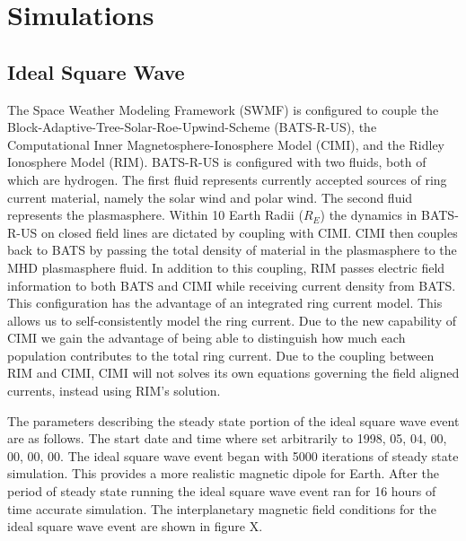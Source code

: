 \documentclass[utf8]{report}
\newcommand{\BATS}[1][0]{BATS-R-US }
\begin{document}
\chapter{Simulations}
 
\section{Ideal Square Wave}
The Space Weather Modeling Framework (SWMF) is configured to couple the Block-Adaptive-Tree-Solar-Roe-Upwind-Scheme (BATS-R-US), the Computational Inner Magnetosphere-Ionosphere Model (CIMI), and the Ridley Ionosphere Model (RIM). \BATS is configured with two fluids, both of which are hydrogen. The first fluid represents currently accepted sources of ring current material, namely the solar wind and polar wind. The second fluid represents the plasmasphere. Within 10 Earth Radii ($R_{E}$) the dynamics in \BATS on closed field lines are dictated by coupling with CIMI.  CIMI then couples back to BATS by passing the total density of material in the plasmasphere to the MHD plasmasphere fluid. In addition to this coupling, RIM passes electric field information to both BATS and CIMI while receiving current density from BATS. This configuration has the advantage of an integrated ring current model. This allows us to self-consistently model the ring current. Due to the new capability of CIMI we gain the advantage of being able to distinguish how much each population contributes to the total ring current. Due to the coupling between RIM and CIMI, CIMI will not solves its own equations governing the field aligned currents, instead using RIM's solution. 

The parameters describing the steady state portion of the ideal square wave event are as follows. The start date and time where set arbitrarily to 1998, 05, 04, 00, 00, 00, 00. The ideal square wave event began with 5000 iterations of steady state simulation. This provides a more realistic magnetic dipole for Earth. After the period of steady state running the ideal square wave event ran for 16 hours of time accurate simulation. The interplanetary magnetic field conditions for the ideal square wave event are shown in figure X. 
\end{document}
